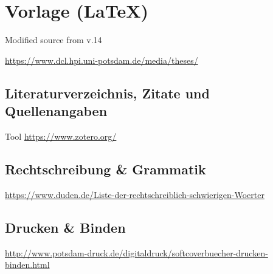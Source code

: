 

\section{Vorlage (LaTeX)}\label{vorlage-latex}

Modified source from v.14

\url{https://www.dcl.hpi.uni-potsdam.de/media/theses/}

\subsection{Literaturverzeichnis, Zitate und
Quellenangaben}\label{literaturverzeichnis-zitate-und-quellenangaben}

Tool \url{https://www.zotero.org/}

\subsection{Rechtschreibung \&
Grammatik}\label{rechtschreibung-grammatik}

\url{https://www.duden.de/Liste-der-rechtschreiblich-schwierigen-Woerter}

\subsection{Drucken \& Binden}\label{drucken-binden}

\url{http://www.potsdam-druck.de/digitaldruck/softcoverbuecher-drucken-binden.html}
